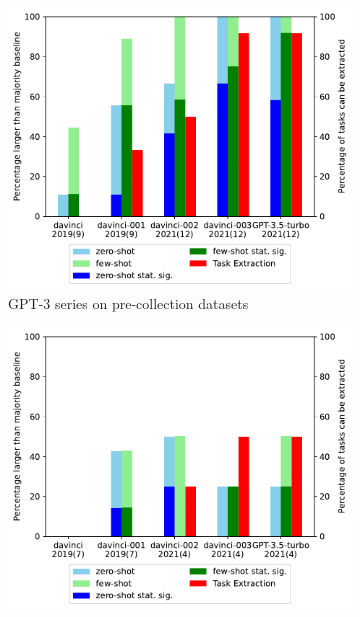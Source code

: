 \documentclass[letterpaper]{article} %
\begin{document}
\begin{figure}[t]
        \centering
        \begin{subfigure}[b]{0.45\textwidth}
            \centering
            \includegraphics[scale=0.45]{img/old-dataset-percentage.pdf}
            \caption[]%
            {GPT-3 series on pre-collection datasets}
            \label{fig:Zero shot performance for old datasets1}
        \end{subfigure}
        \begin{subfigure}[b]{0.45\textwidth}   
            \centering 
            \includegraphics[scale=0.45]{img/new-dataset-percentage.pdf}

\end{subfigure}
\end{figure}
\end{document}
